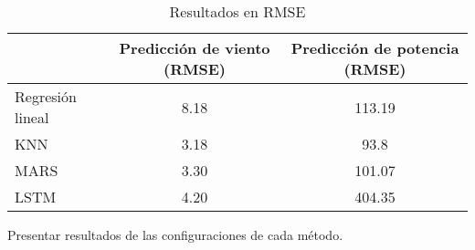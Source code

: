 \documentclass[journal]{IEEEtran}
\begin{document}
\begin{table}[ht]
\centering
\caption{Resultados en RMSE}\label{t:resRMSE}
\begin{tabular}{|l|c|c|}
\hline
& Predicción de viento (RMSE) & Predicción de potencia (RMSE)\\ \hline
Regresión lineal & 8.18 & 113.19 \\ \hline
KNN & 3.18 & 93.8 \\ \hline
MARS & 3.30 & 101.07 \\ \hline
LSTM & 4.20 & 404.35 \\ \hline
\end{tabular}
\end{table}

Presentar resultados de las configuraciones de cada método.

%
%
\end{document}
